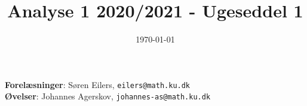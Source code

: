 \documentclass{article}
\title{Analyse 1 2020/2021 - Ugeseddel 1}
\author{}
\date{\vspace{-1cm}\today}
\begin{document}
\maketitle

\noindent
\textbf{Forelæsninger}: S\o{}ren Eilers, \texttt{eilers@math.ku.dk} \\
\textbf{Øvelser}: Johannes Agerskov, \texttt{johannes-as@math.ku.dk}





%
%
%
%
%
%
%
%
%


\end{document}

